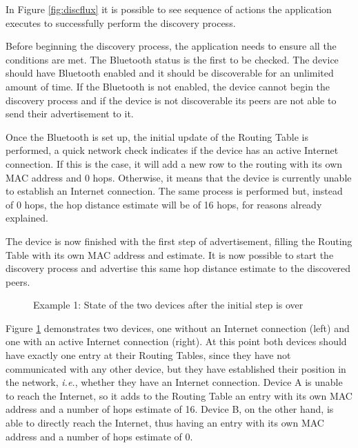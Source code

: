 In Figure \ref{fig:discflux} it is possible to see sequence of actions the application executes to successfully perform the discovery process.

Before beginning the discovery process, the application needs to ensure all the conditions are met. The Bluetooth status is the first to be checked. The device should have Bluetooth enabled and it should be discoverable for an unlimited amount of time. If the Bluetooth is not enabled, the device cannot begin the discovery process and if the device is not discoverable its peers are not able to send their advertisement to it.

Once the Bluetooth is set up, the initial update of the Routing Table is performed, a quick network check indicates if the device has an active Internet connection. If this is the case, it will add a new row to the routing with its own \gls{MAC} address and 0 hops. Otherwise, it means that the device is currently unable to establish an Internet connection. The same process is performed but, instead of 0 hops, the hop distance estimate will be of 16 hops, for reasons already explained.

The device is now finished with the first step of advertisement, filling the Routing Table with its own \gls{MAC} address and estimate. It is now possible to start the discovery process and advertise this same hop distance estimate to the discovered peers.

\begin{figure}[ht]
	\noindent{}
	\caption{\label{fig:adveg1} Example 1: State of the two devices after the initial step is over}
\end{figure}

Figure \ref{fig:adveg1} demonstrates two devices, one without an Internet connection (left) and one with an active Internet connection (right). At this point both devices should have exactly one entry at their Routing Tables, since they have not communicated with any other device, but they have established their position in the network, \textit{i.e.}, whether they have an Internet connection. Device A is unable to reach the Internet, so it adds to the Routing Table an entry with its own \gls{MAC} address and a number of hops estimate of 16. Device B, on the other hand, is able to directly reach the Internet, thus having an entry with its own \gls{MAC} address and a number of hops estimate of 0.

